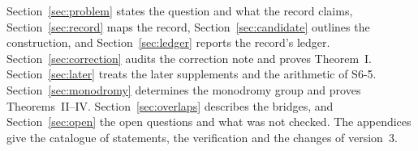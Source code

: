 Section~\ref{sec:problem} states the question and what the record claims, Section~\ref{sec:record} maps the record, Section~\ref{sec:candidate} outlines the construction, and Section~\ref{sec:ledger} reports the record's ledger. Section~\ref{sec:correction} audits the correction note and proves Theorem~I. Section~\ref{sec:later} treats the later supplements and the arithmetic of S6-5. Section~\ref{sec:monodromy} determines the monodromy group and proves Theorems~II--IV. Section~\ref{sec:overlaps} describes the bridges, and Section~\ref{sec:open} the open questions and what was not checked. The appendices give the catalogue of statements, the verification and the changes of version~3.
